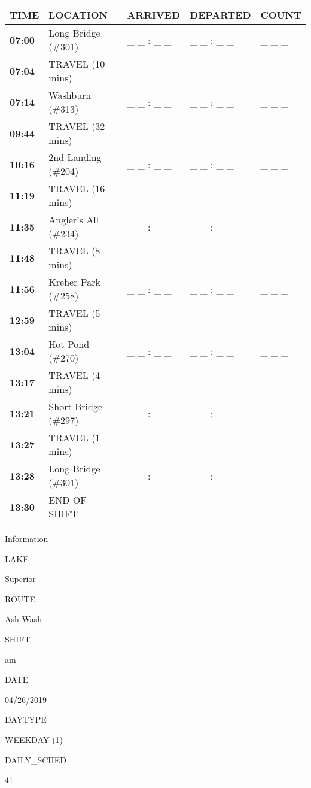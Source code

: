 \documentclass[]{article}
\begin{document}
\begin{tabular}{>{\bfseries}lllll}
\toprule
\textbf{TIME} & \textbf{LOCATION} & \textbf{ARRIVED} & \textbf{DEPARTED} & \textbf{COUNT}\\
\midrule
07:00 & Long Bridge (\#301) & \_ \_ : \_ \_ & \_ \_ : \_ \_ & \_ \_ \_\\
07:04 & TRAVEL (10 mins) &  &  & \\
07:14 & Washburn (\#313) & \_ \_ : \_ \_ & \_ \_ : \_ \_ & \_ \_ \_\\
09:44 & TRAVEL (32 mins) &  &  & \\
10:16 & 2nd Landing (\#204) & \_ \_ : \_ \_ & \_ \_ : \_ \_ & \_ \_ \_\\
11:19 & TRAVEL (16 mins) &  &  & \\
11:35 & Angler's All (\#234) & \_ \_ : \_ \_ & \_ \_ : \_ \_ & \_ \_ \_\\
11:48 & TRAVEL (8 mins) &  &  & \\
11:56 & Kreher Park (\#258) & \_ \_ : \_ \_ & \_ \_ : \_ \_ & \_ \_ \_\\
12:59 & TRAVEL (5 mins) &  &  & \\
13:04 & Hot Pond (\#270) & \_ \_ : \_ \_ & \_ \_ : \_ \_ & \_ \_ \_\\
13:17 & TRAVEL (4 mins) &  &  & \\
13:21 & Short Bridge (\#297) & \_ \_ : \_ \_ & \_ \_ : \_ \_ & \_ \_ \_\\
13:27 & TRAVEL (1 mins) &  &  & \\
13:28 & Long Bridge (\#301) & \_ \_ : \_ \_ & \_ \_ : \_ \_ & \_ \_ \_\\
13:30 & END OF SHIFT &  &  & \\
\bottomrule
\end{tabular}\newpage

Information

LAKE

Superior

ROUTE

Ash-Wash

SHIFT

am

DATE

04/26/2019

DAYTYPE

WEEKDAY (1)

DAILY\_SCHED

41

\vspace{24pt}
\end{document}
